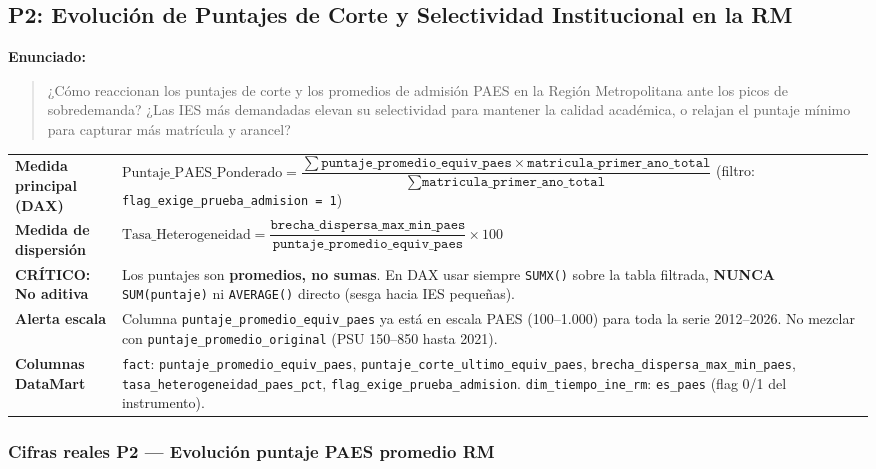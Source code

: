 \documentclass[11pt,a4paper]{article}
\begin{document}
\subsection{P2: Evolución de Puntajes de Corte y Selectividad Institucional en la RM}

\textbf{Enunciado:}
\begin{quote}
¿Cómo reaccionan los puntajes de corte y los promedios de admisión PAES en la
Región Metropolitana ante los picos de sobredemanda? ¿Las IES más demandadas
elevan su selectividad para mantener la calidad académica, o relajan el
puntaje mínimo para capturar más matrícula y arancel?
\end{quote}

\begin{center}\small
\begin{tabularx}{\textwidth}{@{}>{\bfseries}p{4.5cm}Y@{}}
\toprule
Medida principal (DAX) &
  $\text{Puntaje\_PAES\_Ponderado} =
    \dfrac{\displaystyle\sum \texttt{puntaje\_promedio\_equiv\_paes} \times \texttt{matricula\_primer\_ano\_total}}
           {\displaystyle\sum \texttt{matricula\_primer\_ano\_total}}$
  (filtro: \texttt{flag\_exige\_prueba\_admision = 1}) \\[6pt]
Medida de dispersión &
  $\text{Tasa\_Heterogeneidad} =
    \dfrac{\texttt{brecha\_dispersa\_max\_min\_paes}}{\texttt{puntaje\_promedio\_equiv\_paes}} \times 100$ \\[4pt]
\textbf{\color{warnred}CRÍTICO: No aditiva} &
  Los puntajes son \textbf{promedios, no sumas}. En DAX usar siempre
  \texttt{SUMX()} sobre la tabla filtrada, \textbf{NUNCA} \texttt{SUM(puntaje)}
  ni \texttt{AVERAGE()} directo (sesga hacia IES pequeñas). \\
Alerta escala &
  Columna \texttt{puntaje\_promedio\_equiv\_paes} ya está en escala PAES
  (100--1.000) para toda la serie 2012--2026. No mezclar con
  \texttt{puntaje\_promedio\_original} (PSU 150--850 hasta 2021). \\
Columnas DataMart &
  \texttt{fact}: \texttt{puntaje\_promedio\_equiv\_paes},
  \texttt{puntaje\_corte\_ultimo\_equiv\_paes},
  \texttt{brecha\_dispersa\_max\_min\_paes},
  \texttt{tasa\_heterogeneidad\_paes\_pct},
  \texttt{flag\_exige\_prueba\_admision}.
  \texttt{dim\_tiempo\_ine\_rm}: \texttt{es\_paes} (flag 0/1 del instrumento). \\
\bottomrule
\end{tabularx}
\end{center}

\subsubsection{Cifras reales P2 — Evolución puntaje PAES promedio RM}
\end{document}
